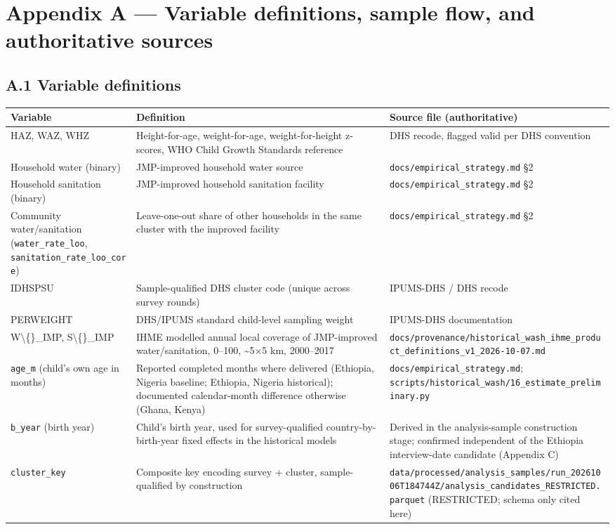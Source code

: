 \section*{Appendix A --- Variable definitions, sample flow, and authoritative sources}

\subsection*{A.1 Variable definitions}

\begingroup\fontsize{10}{15}\selectfont
\begin{longtable}{lll}
\toprule
Variable & Definition & Source file (authoritative) \\
\midrule
\endhead
HAZ, WAZ, WHZ & Height-for-age, weight-for-age, weight-for-height z-scores, WHO Child Growth Standards reference \parencite{deOnis2006} & DHS recode, flagged valid per DHS convention \\
Household water (binary) & JMP-improved household water source & \texttt{docs/empirical\_strategy.md} §2 \\
Household sanitation (binary) & JMP-improved household sanitation facility & \texttt{docs/empirical\_strategy.md} §2 \\
Community water/sanitation (\texttt{water\_rate\_loo}, \texttt{sanitation\_rate\_loo\_core}) & Leave-one-out share of other households in the same cluster with the improved facility & \texttt{docs/empirical\_strategy.md} §2 \\
IDHSPSU & Sample-qualified DHS cluster code (unique across survey rounds) & IPUMS-DHS / DHS recode \\
PERWEIGHT & DHS/IPUMS standard child-level sampling weight & IPUMS-DHS documentation \\
W\textbackslash\{\}\_IMP, S\textbackslash\{\}\_IMP & IHME modelled annual local coverage of JMP-improved water/sanitation, 0--100, \textasciitilde{}5×5 km, 2000--2017 & \texttt{docs/provenance/historical\_wash\_ihme\_product\_definitions\_v1\_2026-10-07.md} \\
\texttt{age\_m} (child's own age in months) & Reported completed months where delivered (Ethiopia, Nigeria baseline; Ethiopia, Nigeria historical); documented calendar-month difference otherwise (Ghana, Kenya) & \texttt{docs/empirical\_strategy.md}; \texttt{scripts/historical\_wash/16\_estimate\_preliminary.py} \\
\texttt{b\_year} (birth year) & Child's birth year, used for survey-qualified country-by-birth-year fixed effects in the historical models & Derived in the analysis-sample construction stage; confirmed independent of the Ethiopia interview-date candidate (Appendix C) \\
\texttt{cluster\_key} & Composite key encoding survey + cluster, sample-qualified by construction & \texttt{data/processed/analysis\_samples/run\_20261006T184744Z/analysis\_candidates\_RESTRICTED.parquet} (RESTRICTED; schema only cited here) \\
\bottomrule
\end{longtable}
\endgroup

